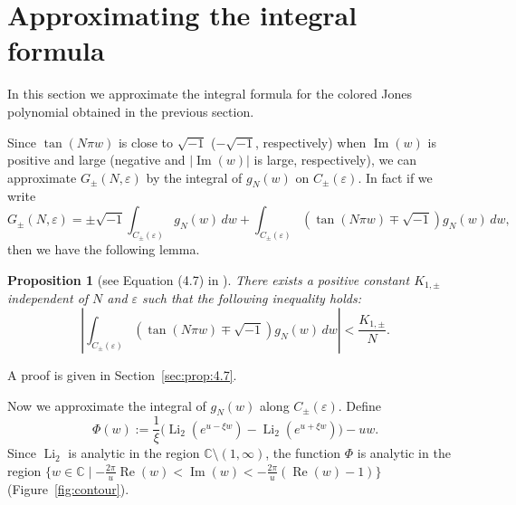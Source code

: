 \documentclass[a4paper]{amsart}
\theoremstyle{plain}
\newtheorem{prop}[thm]{Proposition}
\theoremstyle{definition}
\theoremstyle{remark}
\newtheorem{rem}[thm]{Remark}
\newcommand{\Z}{\mathbb{Z}}
\newcommand{\C}{\mathbb{C}}
\newcommand{\R}{\mathbb{R}}
\newcommand{\Li}{\operatorname{Li}}
\renewcommand{\Re}{\operatorname{Re}}
\renewcommand{\Im}{\operatorname{Im}}
\numberwithin{equation}{section}
\begin{document}
\section{Approximating the integral formula}
\label{sec:approximation}
In this section we approximate the integral formula for the colored Jones polynomial obtained in the previous section.
\par
Since $\tan(N\pi w)$ is close to $\sqrt{-1}$ ($-\sqrt{-1}$, respectively) when $\Im(w)$ is positive and large (negative and $|\Im(w)|$ is large, respectively), we can approximate $G_{\pm}(N,\varepsilon)$ by the integral of $g_N(w)$ on $C_{\pm}(\varepsilon)$.
In fact if we write
\begin{equation*}
  G_{\pm}(N,\varepsilon)
  =
  \pm\sqrt{-1}\int_{C_{\pm}(\varepsilon)}g_N(w)\,dw
  +
  \int_{C_{\pm}(\varepsilon)}(\tan(N\pi w)\mp\sqrt{-1})g_N(w)\,dw,
\end{equation*}
then we have the following lemma.
\begin{prop}[see Equation (4.7) in \cite{Andersen/Hansen:JKNOT2006}]\label{prop:4.7}
There exists a positive constant $K_{1,\pm}$ independent of $N$ and $\varepsilon$ such that the following inequality holds:
\begin{equation*}
  \left|
    \int_{C_{\pm}(\varepsilon)}(\tan(N\pi w)\mp\sqrt{-1})g_N(w)\,dw
  \right|
  <
  \frac{K_{1,\pm}}{N}.
\end{equation*}
\end{prop}
A proof is given in Section~\ref{sec:prop:4.7}.
\par
Now we approximate the integral of $g_N(w)$ along $C_{\pm}(\varepsilon)$.
Define
\begin{equation*}
  \Phi(w)
  :=
  \frac{1}{\xi}
  \bigl(
    \Li_2\left(e^{u-\xi w}\right)-\Li_2\left(e^{u+\xi w}\right)
  \bigr)
  -uw.
\end{equation*}
Since $\Li_2$ is analytic in the region $\C\setminus(1,\infty)$, the function $\Phi$ is analytic in the region $\{w\in\C\mid-\frac{2\pi}{u}\Re(w)<\Im(w)<-\frac{2\pi}{u}(\Re(w)-1)\}$ (Figure~\ref{fig:contour}).
\par

\end{document}
